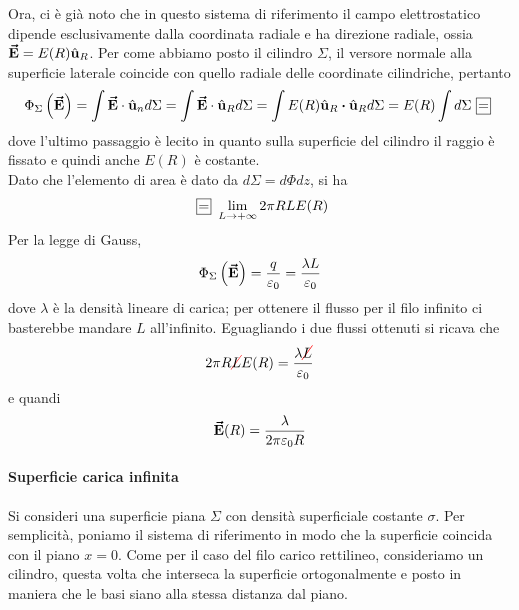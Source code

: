 Ora, ci è già noto che in questo sistema di riferimento il campo elettrostatico dipende esclusivamente dalla coordinata radiale e ha direzione radiale, ossia $\vb*{\va{E}}=E(R)\hat{\mathbf{u}}_R$. Per come abbiamo posto il cilindro $\Sigma$, il versore normale alla superficie laterale coincide con quello radiale delle coordinate cilindriche, pertanto
\begin{equation*}
	\Phi_{\Sigma}\left(\vba{E}\right)=\int\vba{E}\cdot\vbh{u}_nd\Sigma=\int\vba{E}\cdot\vbh{u}_Rd\Sigma=\int E(R)\vbh{u}_R\vdot\vbh{u}_Rd\Sigma=E(R)\int d\Sigma\squarequal
\end{equation*}
dove l'ultimo passaggio è lecito in quanto sulla superficie del cilindro il raggio è fissato e quindi anche $E(R)$ è costante.\\
Dato che l'elemento di area è dato da $d\Sigma=d\Phi dz$, si ha
\begin{equation*}
	\squarequal\lim_{L\to+\infty}2\pi R L E(R)
\end{equation*}
Per la legge di Gauss,
\begin{equation*}
	\Phi_{\Sigma}\left(\vb*{\va{E}}\right)=\frac{q}{\varepsilon_0}=\frac{\lambda L}{\varepsilon_0}
\end{equation*}
dove $\lambda$ è la densità lineare di carica; per ottenere il flusso per il filo infinito ci basterebbe mandare $L$ all'infinito. Eguagliando i due flussi ottenuti si ricava che
\begin{equation*}
	2\pi R\Ccancel[red]{L}E(R)=\frac{\lambda \Ccancel[red]{L}}{\epsilon_0}
\end{equation*}
e quandi
\begin{equation}
	\vb*{\va{E}}(R)=\frac{\lambda}{2\pi\varepsilon_0 R}
\end{equation}
\paragraph{Superficie carica infinita}
Si consideri una superficie piana $\Sigma$ con densità superficiale costante $\sigma$. Per semplicità, poniamo il sistema di riferimento in modo che la superficie coincida con il piano $x=0$. Come per il caso del filo carico rettilineo, consideriamo un cilindro, questa volta che interseca la superficie ortogonalmente e posto in maniera che le basi siano alla stessa distanza dal piano.

